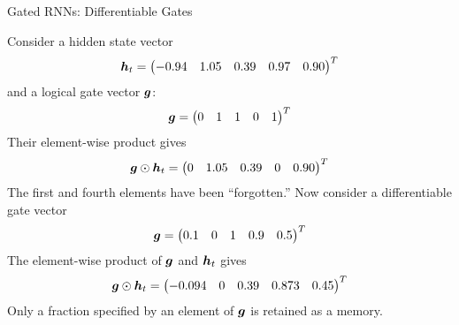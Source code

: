\begin{frame}{Gated RNNs: Differentiable Gates}

    Consider a hidden state vector
    \begin{align*}
        {\boldsymbol h}_t = \begin{pmatrix} -0.94 & 1.05 & 0.39 & 0.97 & 0.90 \end{pmatrix}^T
    \end{align*}
    and a logical gate vector ${\boldsymbol g}$:
    \begin{align*}
        {\boldsymbol g} = \begin{pmatrix} 0 & 1 & 1 & 0 & 1 \end{pmatrix}^T
    \end{align*}
    Their element-wise product gives
    \begin{align*}
        {\boldsymbol g} \odot {\boldsymbol h}_{t} = \begin{pmatrix} 0 & 1.05 & 0.39 & 0 & 0.90 \end{pmatrix}^T
    \end{align*}
    The first and fourth elements have been
    ``forgotten.''
    Now consider a differentiable gate vector
    \begin{align*}
        {\boldsymbol g} = \begin{pmatrix} 0.1 & 0 & 1 & 0.9 & 0.5 \end{pmatrix}^T
    \end{align*}
    The element-wise product of ${\boldsymbol g}$ and ${\boldsymbol h}_t$ gives
    \begin{align*}
        {\boldsymbol g} \odot {\boldsymbol h}_{t} = \begin{pmatrix} -0.094 & 0 & 0.39 & 0.873 & 0.45 \end{pmatrix}^T
    \end{align*}
    Only a fraction specified by an element of ${\boldsymbol g}$ is
    retained as a memory.
\end{frame}
%
%
